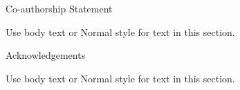 

\setcounter{page}{2}

\clearpage


\doublespacing

\clearpage


\clearpage
\begin{center} \Large Co-authorship Statement \end{center}

Use body text or Normal style for text in this section.

\clearpage
\begin{center} \Large Acknowledgements \end{center}

Use body text or Normal style for text in this section.

\clearpage
\singlespacing
\tableofcontents

\clearpage
\listoftables

\clearpage
\listoffigures
